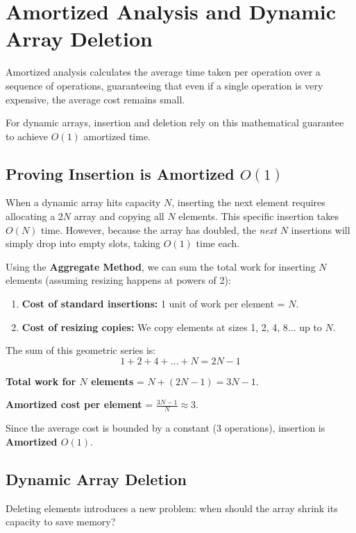 \documentclass{article}
\begin{document}
\section{Amortized Analysis and Dynamic Array Deletion}

Amortized analysis calculates the average time taken per operation over a sequence of operations, guaranteeing that even if a single operation is very expensive, the average cost remains small.

For dynamic arrays, insertion and deletion rely on this mathematical guarantee to achieve $O(1)$ amortized time.

\subsection{Proving Insertion is Amortized $O(1)$}

When a dynamic array hits capacity $N$, inserting the next element requires allocating a $2N$ array and copying all $N$ elements. This specific insertion takes $O(N)$ time. However, because the array has doubled, the \textit{next} $N$ insertions will simply drop into empty slots, taking $O(1)$ time each.

Using the \textbf{Aggregate Method}, we can sum the total work for inserting $N$ elements (assuming resizing happens at powers of 2):
\begin{enumerate}
    \item \textbf{Cost of standard insertions:} 1 unit of work per element = $N$.
    \item \textbf{Cost of resizing copies:} We copy elements at sizes 1, 2, 4, 8... up to $N$. 
\end{enumerate}

The sum of this geometric series is: 
\[ 1 + 2 + 4 + \dots + N = 2N - 1 \]

\textbf{Total work for $N$ elements} = $N + (2N - 1) = 3N - 1$.

\textbf{Amortized cost per element} = $\frac{3N - 1}{N} \approx 3$.

Since the average cost is bounded by a constant (3 operations), insertion is \textbf{Amortized $O(1)$}.

\subsection{Dynamic Array Deletion}

Deleting elements introduces a new problem: when should the array shrink its capacity to save memory? 
\end{document}
